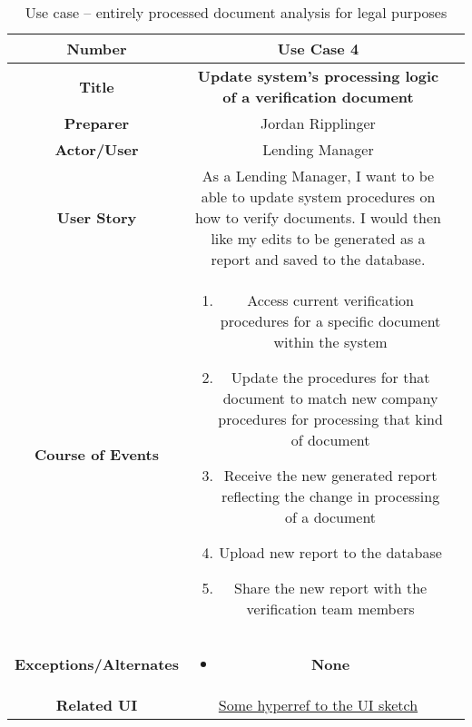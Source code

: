 \begin{table}[H]
    \centering
    \begin{tabularx}{0.75\linewidth}{||Sc|X||}
        \hline
        \hline
        \textbf{Number} & \textbf{Use Case 4} \\
        \hline
        \textbf{Title} & \textbf{Update system's processing logic of a verification document} \\
        \hline
        \textbf{Preparer} & Jordan Ripplinger \\
        \hline
        \textbf{Actor/User} & Lending Manager \\
        \hline
        \textbf{User Story} &
        As a Lending Manager, I want to be able to update system procedures on how to verify documents. I would then like my edits to be generated as a report and saved to the database. \\
        \hline
        \textbf{Course of Events} &
        \begin{minipage}[l]{\linewidth}
            \begin{enumerate}[wide, labelindent=0pt]
                \item Access current verification procedures for a specific document within the system
                \item Update the procedures for that document to match new company procedures for processing that kind of document
                \item Receive the new generated report reflecting the change in processing of a document
                \item Upload new report to the database
                \item Share the new report with the verification team members
            \end{enumerate}
            \vspace{4pt}
        \end{minipage} \\
        \hline
        \textbf{Exceptions/Alternates} & 
        \begin{minipage}[l]{\linewidth}
            \vspace{2pt}
            \begin{itemize}[wide, labelindent=0pt]
                \item \textbf{None}
            \end{itemize}
        \end{minipage} \\
        \hline
        \textbf{Related UI} & \hyperref[templatesec]{Some hyperref to the UI sketch} \\
        \hline
        \hline
    \end{tabularx}
    \caption{Use case -- entirely processed document analysis for legal purposes}
    \label{tab:use_cases_legal}
\end{table}

